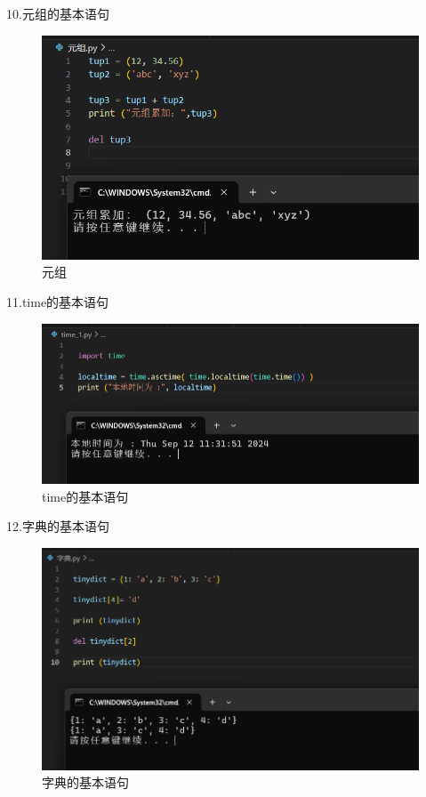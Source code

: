 \documentclass[a4paper, 12pt]{article}
\begin{document}
10.元组的基本语句
 \begin{figure}[H]
  \centering
  \includegraphics[width=1\textwidth]{屏幕截图 2024-09-12 113011.png}
  \caption{元组}
    \end{figure}

    
11.time的基本语句
     \begin{figure}[H]
  \centering
  \includegraphics[width=1\textwidth]{屏幕截图 2024-09-12 113159.png}
  \caption{time的基本语句}
    \end{figure}

12.字典的基本语句
 \begin{figure}[H]
  \centering
  \includegraphics[width=1\textwidth]{屏幕截图 2024-09-12 113929.png}
  \caption{字典的基本语句}
    \end{figure}
\end{document}

